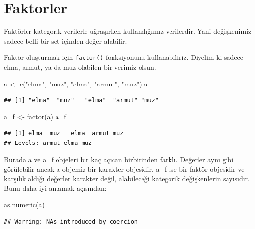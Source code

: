 \documentclass[
]{book}
\newenvironment{Shaded}{\begin{snugshade}}{\end{snugshade}}
\newcommand{\FunctionTok}[1]{\textcolor[rgb]{0.00,0.00,0.00}{#1}}
\newcommand{\NormalTok}[1]{#1}
\newcommand{\OtherTok}[1]{\textcolor[rgb]{0.56,0.35,0.01}{#1}}
\newcommand{\StringTok}[1]{\textcolor[rgb]{0.31,0.60,0.02}{#1}}
\begin{document}
\hypertarget{faktorler}{%
\chapter{Faktorler}\label{faktorler}}

Faktörler kategorik verilerle uğraşırken kullandığımız verilerdir. Yani değişkenimiz sadece belli bir set içinden değer alabilir.

Faktör oluşturmak için \texttt{factor()} fonksiyonunu kullanabiliriz. Diyelim ki sadece elma, armut, ya da muz olabilen bir verimiz olsun.

\begin{Shaded}
\begin{Highlighting}[]
\NormalTok{a }\OtherTok{\textless{}{-}}  \FunctionTok{c}\NormalTok{(}\StringTok{"elma"}\NormalTok{, }\StringTok{"muz"}\NormalTok{, }\StringTok{"elma"}\NormalTok{, }\StringTok{"armut"}\NormalTok{, }\StringTok{"muz"}\NormalTok{)}
\NormalTok{a}
\end{Highlighting}
\end{Shaded}

\begin{verbatim}
## [1] "elma"  "muz"   "elma"  "armut" "muz"
\end{verbatim}

\begin{Shaded}
\begin{Highlighting}[]
\NormalTok{a\_f }\OtherTok{\textless{}{-}} \FunctionTok{factor}\NormalTok{(a)}
\NormalTok{a\_f}
\end{Highlighting}
\end{Shaded}

\begin{verbatim}
## [1] elma  muz   elma  armut muz  
## Levels: armut elma muz
\end{verbatim}

Burada a ve a\_f objeleri bir kaç açıcan birbirinden farklı. Değerler aynı gibi görülebilir ancak a objemiz bir karakter objesidir. a\_f ise bir faktör objesidir ve karşılık aldığı değerler karakter değil, alabileceği kategorik değişkenlerin sayısıdır. Bunu daha iyi anlamak açısından:

\begin{Shaded}
\begin{Highlighting}[]
\FunctionTok{as.numeric}\NormalTok{(a)}
\end{Highlighting}
\end{Shaded}

\begin{verbatim}
## Warning: NAs introduced by coercion
\end{verbatim}
\end{document}

